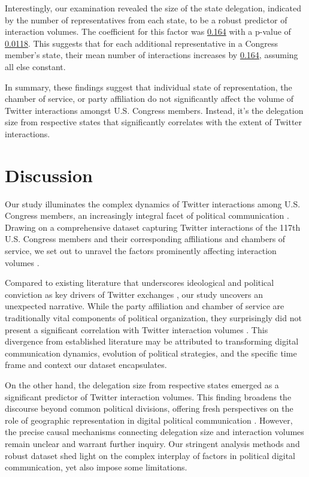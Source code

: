 \documentclass[11pt]{article}
\begin{document}
Interestingly, our examination revealed the size of the state delegation, indicated by the number of representatives from each state, to be a robust predictor of interaction volumes. The coefficient for this factor was \hyperlink{B5a}{0.164} with a p-value of \hyperlink{B5b}{0.0118}. This suggests that for each additional representative in a Congress member's state, their mean number of interactions increases by \hyperlink{B5a}{0.164}, assuming all else constant.

In summary, these findings suggest that individual state of representation, the chamber of service, or party affiliation do not significantly affect the volume of Twitter interactions amongst U.S. Congress members. Instead, it's the delegation size from respective states that significantly correlates with the extent of Twitter interactions.

\section*{Discussion}

Our study illuminates the complex dynamics of Twitter interactions among U.S. Congress members, an increasingly integral facet of political communication \cite{Ausserhofer2013NATIONALPO, Stier2018ElectionCO, Jungherr2016TwitterUI}. Drawing on a comprehensive dataset capturing Twitter interactions of the 117th U.S. Congress members and their corresponding affiliations and chambers of service, we set out to unravel the factors prominently affecting interaction volumes \cite{Hemphill2013WhatsCD, Peng2016FollowerFolloweeNC}.

Compared to existing literature that underscores ideological and political conviction as key drivers of Twitter exchanges \cite{Theocharis2020TheDO, Lu2019TheEO}, our study uncovers an unexpected narrative. While the party affiliation and chamber of service are traditionally vital components of political organization, they surprisingly did not present a significant correlation with Twitter interaction volumes \cite{Chen2012WhyYA, Hu2015PredictingUE}. This divergence from established literature may be attributed to transforming digital communication dynamics, evolution of political strategies, and the specific time frame and context our dataset encapsulates.

On the other hand, the delegation size from respective states emerged as a significant predictor of Twitter interaction volumes. This finding broadens the discourse beyond common political divisions, offering fresh perspectives on the role of geographic representation in digital political communication \cite{Pablo2014TowardAE, Henn2014SocialDI}. However, the precise causal mechanisms connecting delegation size and interaction volumes remain unclear and warrant further inquiry. Our stringent analysis methods and robust dataset shed light on the complex interplay of factors in political digital communication, yet also impose some limitations.
\end{document}
